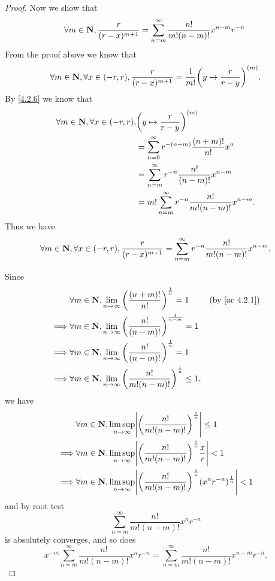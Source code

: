 \begin{proof}
  Now we show that
  \[
    \forall m \in \mathbf{N}, \frac{r}{(r - x)^{m + 1}} = \sum_{n = m}^\infty \frac{n!}{m! (n - m)!} x^{n - m} r^{-n}.
  \]
  From the proof above we know that
  \[
    \forall m \in \mathbf{N}, \forall x \in (-r, r), \frac{r}{(r - x)^{m + 1}} = \frac{1}{m!} \bigg(y \mapsto \frac{r}{r - y}\bigg)^{(m)}.
  \]
  By \cref{4.2.6} we know that
  \begin{align*}
    \forall m \in \mathbf{N}, \forall x \in (-r, r), & \bigg(y \mapsto \frac{r}{r - y}\bigg)^{(m)}                       \\
                                             & = \sum_{n = 0}^\infty r^{-(n + m)} \frac{(n + m)!}{n!} x^n        \\
                                             & = \sum_{n = m}^\infty r^{-n} \frac{n!}{(n - m)!} x^{n - m}        \\
                                             & = m! \sum_{n = m}^\infty r^{-n} \frac{n!}{m! (n - m)!} x^{n - m}.
  \end{align*}
  Thus we have
  \[
    \forall m \in \mathbf{N}, \forall x \in (-r, r), \frac{r}{(r - x)^{m + 1}} = \sum_{n = m}^\infty r^{-n} \frac{n!}{m! (n - m)!} x^{n - m}.
  \]

  Since
  \begin{align*}
             & \forall m \in \N, \lim_{n \to \infty} \bigg(\frac{(n + m)!}{n!}\bigg)^{\frac{1}{n}} = 1        & \text{(by \cref{ac 4.2.1})} \\
    \implies & \forall m \in \N, \lim_{n \to \infty} \bigg(\frac{n!}{(n - m)!}\bigg)^{\frac{1}{n - m}} = 1                                  \\
    \implies & \forall m \in \N, \lim_{n \to \infty} \bigg(\frac{n!}{(n - m)!}\bigg)^{\frac{1}{n}} = 1                                      \\
    \implies & \forall m \in \N, \lim_{n \to \infty} \bigg(\frac{n!}{m! (n - m)!}\bigg)^{\frac{1}{n}} \leq 1,
  \end{align*}
  we have
  \begin{align*}
             & \forall m \in \N, \limsup_{n \to \infty} \abs{\bigg(\frac{n!}{m! (n - m)!}\bigg)^{\frac{1}{n}}} \leq 1                         \\
    \implies & \forall m \in \N, \limsup_{n \to \infty} \abs{\bigg(\frac{n!}{m! (n - m)!}\bigg)^{\frac{1}{n}} \frac{x}{r}} < 1                \\
    \implies & \forall m \in \N, \limsup_{n \to \infty} \abs{\bigg(\frac{n!}{m! (n - m)!}\bigg)^{\frac{1}{n}} (x^n r^{-n})^{\frac{1}{n}}} < 1
  \end{align*}
  and by root test
  \[
    \sum_{n = m}^\infty \frac{n!}{m! (n - m)!} x^n r^{-n}
  \]
  is absolutely converges, and so does
  \[
    x^{-m} \sum_{n = m}^\infty \frac{n!}{m! (n - m)!} x^n r^{-n} = \sum_{n = m}^\infty \frac{n!}{m! (n - m)!} x^{n - m} r^{-n}.
  \]
\end{proof}

